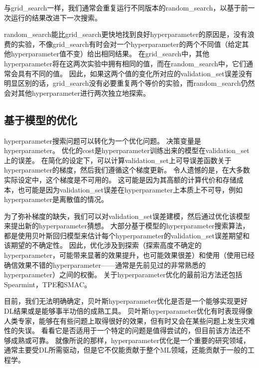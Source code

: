 与\gls{grid_search}一样，我们通常会重复运行不同版本的\gls{random_search}，以基于前一次运行的结果改进下一次搜索。


\gls{random_search}能比\gls{grid_search}更快地找到良好\gls{hyperparameter}的原因是，没有浪费的实验，不像\gls{grid_search}有时会对一个\gls{hyperparameter}的两个不同值（给定其他\gls{hyperparameter}值不变）给出相同结果。
在\gls{grid_search}中，其他\gls{hyperparameter}将在这两次实验中拥有相同的值，而在\gls{random_search}中，它们通常会具有不同的值。
因此，如果这两个值的变化所对应的\gls{validation_set}误差没有明显区别的话，\gls{grid_search}没有必要重复两个等价的实验，而\gls{random_search}仍然会对其他\gls{hyperparameter}进行两次独立地探索。


\subsection{基于模型的优化}
\label{sec:model_based_hyperparameter_optimization}
\gls{hyperparameter}搜索问题可以转化为一个优化问题。
决策变量是\gls{hyperparameter}。
优化的\gls{cost}是\gls{hyperparameter}训练出来的模型在\gls{validation_set}上的误差。
在简化的设定下，可以计算\gls{validation_set}上可导误差函数关于\gls{hyperparameter}的梯度，然后我们遵循这个梯度更新\citep{bengio:1999:snowbird,bengio-hyper-NC00,maclaurin2015gradient}。
令人遗憾的是，在大多数实际设定中，这个梯度是不可用的。
这可能是因为其高额的计算代价和存储成本，也可能是因为\gls{validation_set}误差在\gls{hyperparameter}上本质上不可导，例如\gls{hyperparameter}是离散值的情况。


为了弥补梯度的缺失，我们可以对\gls{validation_set}误差建模，然后通过优化该模型来提出新的\gls{hyperparameter}猜想。
大部分基于模型的\gls{hyperparameter}搜索算法，都是使用贝叶斯回归模型来估计每个\gls{hyperparameter}的\gls{validation_set}误差期望和该期望的不确定性。
因此，优化涉及到探索（探索高度不确定的\gls{hyperparameter}，可能带来显著的效果提升，也可能效果很差）和使用（使用已经确信效果不错的\gls{hyperparameter}——通常是先前见过的非常熟悉的\gls{hyperparameter}）之间的权衡。
关于\gls{hyperparameter}优化的最前沿方法还包括Spearmint\citep{Snoek+al-NIPS2012-small}，TPE\citep{Bergstra+al-NIPS2011}和SMAC\citep{hutter+hoos+leyton+brown:2011}。


目前，我们无法明确确定，贝叶斯\gls{hyperparameter}优化是否是一个能够实现更好\gls{DL}结果或是能够事半功倍的成熟工具。
贝叶斯\gls{hyperparameter}优化有时表现得像人类专家，能够在有些问题上取得很好的效果，但有时又会在某些问题上发生灾难性的失误。
看看它是否适用于一个特定的问题是值得尝试的，但目前该方法还不够成熟或可靠。
就像所说的那样，\gls{hyperparameter}优化是一个重要的研究领域，通常主要受\gls{DL}所需驱动，但是它不仅能贡献于整个\gls{ML}领域，还能贡献于一般的工程学。


